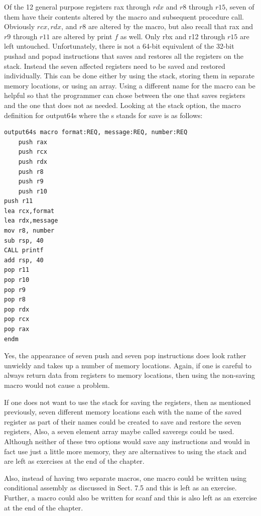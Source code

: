 \documentclass[10pt]{book}
\begin{document}
Of the 12 general purpose registers rax through $r d x$ and $r 8$ through $r 15$, seven of them have their contents altered by the macro and subsequent procedure call. Obviously $r c x, r d x$, and $r 8$ are altered by the macro, but also recall that rax and $r 9$ through $r 11$ are altered by print $f$ as well. Only rbx and r12 through $r 15$ are left untouched. Unfortunately, there is not a 64-bit equivalent of the 32-bit pushad and popad instructions that saves and restores all the registers on the stack. Instead the seven affected registers need to be saved and restored individually. This can be done either by using the stack, storing them in separate memory locations, or using an array. Using a different name for the macro can be helpful so that the programmer can chose between the one that saves registers and the one that does not as needed. Looking at the stack option, the macro definition for output64s where the s stands for save is as follows:

\begin{verbatim}
output64s macro format:REQ, message:REQ, number:REQ
    push rax
    push rcx
    push rdx
    push r8
    push r9
    push r10
push r11
lea rcx,format
lea rdx,message
mov r8, number
sub rsp, 40
CALL printf
add rsp, 40
pop r11
pop r10
pop r9
pop r8
pop rdx
pop rcx
pop rax
endm
\end{verbatim}

Yes, the appearance of seven push and seven pop instructions does look rather unwieldy and takes up a number of memory locations. Again, if one is careful to always return data from registers to memory locations, then using the non-saving macro would not cause a problem.


If one does not want to use the stack for saving the registers, then as mentioned previously, seven different memory locations each with the name of the saved register as part of their names could be created to save and restore the seven registers, Also, a seven element array maybe called saveregs could be used. Although neither of these two options would save any instructions and would in fact use just a little more memory, they are alternatives to using the stack and are left as exercises at the end of the chapter.

Also, instead of having two separate macros, one macro could be written using conditional assembly as discussed in Sect. 7.5 and this is left as an exercise. Further, a macro could also be written for scanf and this is also left as an exercise at the end of the chapter.
\end{document}
